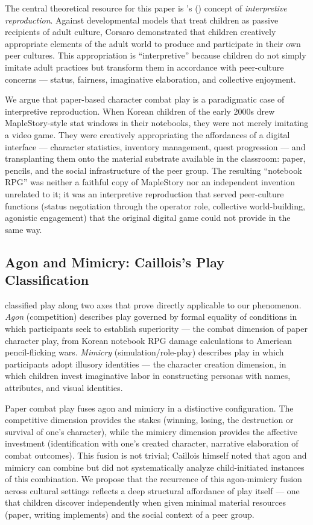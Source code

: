 \documentclass[12pt]{article}
\begin{document}
The central theoretical resource for this paper is \citeauthor{corsaro2005}'s (\citeyear{corsaro2005}) concept of \emph{interpretive reproduction}. Against developmental models that treat children as passive recipients of adult culture, Corsaro demonstrated that children creatively appropriate elements of the adult world to produce and participate in their own peer cultures. This appropriation is ``interpretive'' because children do not simply imitate adult practices but transform them in accordance with peer-culture concerns --- status, fairness, imaginative elaboration, and collective enjoyment.

We argue that paper-based character combat play is a paradigmatic case of interpretive reproduction. When Korean children of the early 2000s drew MapleStory-style stat windows in their notebooks, they were not merely imitating a video game. They were creatively appropriating the affordances of a digital interface --- character statistics, inventory management, quest progression --- and transplanting them onto the material substrate available in the classroom: paper, pencils, and the social infrastructure of the peer group. The resulting ``notebook RPG'' was neither a faithful copy of MapleStory nor an independent invention unrelated to it; it was an interpretive reproduction that served peer-culture functions (status negotiation through the operator role, collective world-building, agonistic engagement) that the original digital game could not provide in the same way.

\subsection{Agon and Mimicry: Caillois's Play Classification}

\citet{caillois1961} classified play along two axes that prove directly applicable to our phenomenon. \emph{Agon} (competition) describes play governed by formal equality of conditions in which participants seek to establish superiority --- the combat dimension of paper character play, from Korean notebook RPG damage calculations to American pencil-flicking wars. \emph{Mimicry} (simulation/role-play) describes play in which participants adopt illusory identities --- the character creation dimension, in which children invest imaginative labor in constructing personas with names, attributes, and visual identities.

Paper combat play fuses agon and mimicry in a distinctive configuration. The competitive dimension provides the stakes (winning, losing, the destruction or survival of one's character), while the mimicry dimension provides the affective investment (identification with one's created character, narrative elaboration of combat outcomes). This fusion is not trivial; Caillois himself noted that agon and mimicry can combine but did not systematically analyze child-initiated instances of this combination. We propose that the recurrence of this agon-mimicry fusion across cultural settings reflects a deep structural affordance of play itself --- one that children discover independently when given minimal material resources (paper, writing implements) and the social context of a peer group.
\end{document}
